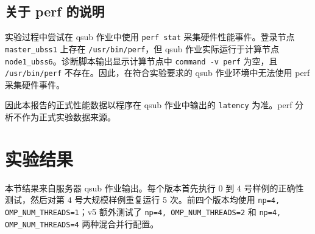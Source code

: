 \documentclass[a4paper]{article}
\begin{document}
\subsection{关于 perf 的说明}

实验过程中尝试在 qsub 作业中使用 \texttt{perf stat} 采集硬件性能事件。登录节点 \texttt{master\_ubss1} 上存在 \texttt{/usr/bin/perf}，但 qsub 作业实际运行于计算节点 \texttt{node1\_ubss6}。诊断脚本输出显示计算节点中 \texttt{command -v perf} 为空，且 \texttt{/usr/bin/perf} 不存在。因此，在符合实验要求的 qsub 作业环境中无法使用 perf 采集硬件事件。

因此本报告的正式性能数据以程序在 qsub 作业中输出的 \texttt{latency} 为准。perf 分析不作为正式实验数据来源。

\section{实验结果}

本节结果来自服务器 qsub 作业输出。每个版本首先执行 $0$ 到 $4$ 号样例的正确性测试，然后对第 $4$ 号大规模样例重复运行 5 次。前四个版本均使用 \texttt{np=4, OMP\_NUM\_THREADS=1}；v5 额外测试了 \texttt{np=4, OMP\_NUM\_THREADS=2} 和 \texttt{np=4, OMP\_NUM\_THREADS=4} 两种混合并行配置。

\begin{table}[H]
  \centering
  \caption{各版本在 0--4 号样例上的正确性测试}
  \label{tab:correctness}
\end{table}
\end{document}
